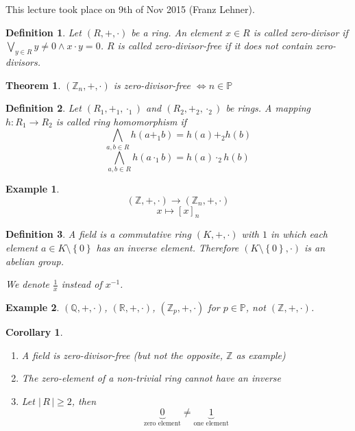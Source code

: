 \documentclass[a4paper,landscape,twocolumn]{article}
\newcommand\meta[3]{This #1 took place on #2 (#3).\par}
\newcommand\set[1]{\left\{#1\right\}}
\newcommand\card[1]{\left|\,#1\,\right|}
\newtheorem{theorem}{Theorem}
\newtheorem{defi}{Definition}
\newtheorem{ex}{Example}
\newtheorem{cor}{Corollary}
\begin{document}
\meta{lecture}{9th of Nov 2015}{Franz Lehner}

\begin{defi}
  Let $(R, +, \cdot)$ be a ring. An element $x \in R$ is called zero-divisor
  if $\bigvee_{y \in R} y \neq 0 \land x \cdot y = 0$.
  $R$ is called zero-divisor-free if it does not contain zero-divisors.
\end{defi}

\begin{theorem}
  $(\mathbb Z_n, +, \cdot)$ is zero-divisor-free
  $\Leftrightarrow n \in \mathbb P$
\end{theorem}

\begin{defi}
  Let $(R_1, +_1, \cdot_1)$ and $(R_2, +_2, \cdot_2)$ be rings.
  A mapping $h: R_1 \rightarrow R_2$ is called \emph{ring homomorphism}
  if
  \[ \bigwedge_{a,b \in R} h(a +_1 b) = h(a) +_2 h(b) \]
  \[ \bigwedge_{a,b \in R} h(a \cdot_1 b) = h(a) \cdot_2 h(b) \]
\end{defi}

\begin{ex}
  \[ (\mathbb Z, +, \cdot) \rightarrow (\mathbb Z_n, +, \cdot) \]
  \[ x \mapsto [x]_n \]
\end{ex}

\begin{defi}
  A field is a commutative ring $(K, +, \cdot)$ with $1$ in which each element
  $a \in K \setminus \set{0}$ has an inverse element.
  Therefore $(K \setminus \set{0}, \cdot)$ is an abelian group.

  We denote $\frac1x$ instead of $x^{-1}$.
\end{defi}

\begin{ex}
  $(\mathbb Q, +, \cdot)$,
  $(\mathbb R, +, \cdot)$,
  $(\mathbb Z_p, +, \cdot)$
  for $p \in \mathbb P$, not $(\mathbb Z, +, \cdot)$.
\end{ex}

\begin{cor}
  \hfill{}
  \begin{enumerate}
    \item A field is zero-divisor-free (but not the opposite, $\mathbb Z$ as example)
    \item The zero-element of a non-trivial ring cannot have an inverse
    \item Let $\card{R} \geq 2$, then
      \[ \underbrace{0}_{\text{zero element}} \neq \underbrace{1}_{\text{one element}} \]
  \end{enumerate}
\end{cor}
\end{document}

